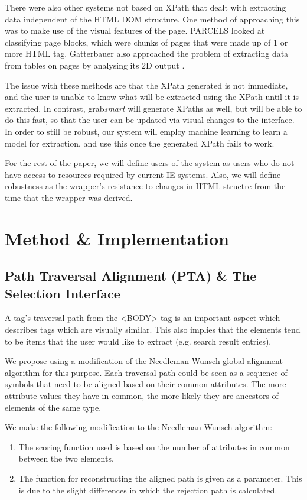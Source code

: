 \documentclass[a4paper,12pt]{nurop}
\begin{document}
There were also other systems not based on XPath that
dealt with extracting data independent of the HTML DOM structure. One method of approaching
this was to make use of the visual features of the page. PARCELS \cite{Lee2004} looked at 
classifying page blocks, which were chunks of pages that were made up of 1 or more HTML tag.
Gatterbauer also approached the problem of extracting data from tables on pages by
analysing its 2D output \cite{Gatterbauer2007}.

The issue with these methods are that the XPath generated is not immediate, and the user is unable to know
what will be extracted using the XPath until it is extracted. In contrast, grab\textit{smart} will generate XPaths as well, but will be able to do this fast, so that
the user can be updated via visual changes to the interface. In order
to still be robust, our system will employ machine learning to learn a model for extraction, and use this
once the generated XPath fails to work.

For the rest of the paper, we will define users of the system as users who do not have access to resources
required by current IE systems. Also, we will define robustness as the wrapper's resistance to changes in
HTML structre from the time that the wrapper was derived.

\section{Method \& Implementation}
\subsection{Path Traversal Alignment (PTA) \& The Selection Interface}
A tag's traversal path from the \url{<BODY>} tag is an important aspect which describes tags which are 
visually similar. This also implies that the elements tend to be items that the user would
like to extract (e.g. search result entries).

We propose using a modification of the Needleman-Wunsch \cite{Needleman1970} global
alignment algorithm for this purpose. Each traversal path could be seen as a sequence of
symbols that need to be aligned based on their common attributes. The more attribute-values
they have in common, the more likely they are ancestors of elements of the same type.

We make the following modification to the Needleman-Wunsch algorithm:
\begin{enumerate}
	\item The scoring function used is based on the number of attributes
	in common between the two elements.
	\item The function for reconstructing the aligned path is given as a parameter. This is due
	to the slight differences in which the rejection path is calculated.
\end{enumerate}
\end{document}
